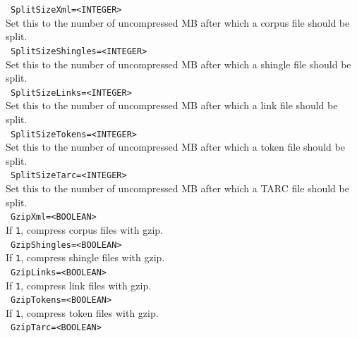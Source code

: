 \documentclass[12pt,a4paper]{article}
\begin{document}
\noindent\textbullet~\texttt{SplitSizeXml=<INTEGER>}\\

Set this to the number of uncompressed MB after which a corpus file should be split.\\

\noindent\textbullet~\texttt{SplitSizeShingles=<INTEGER>}\\

Set this to the number of uncompressed MB after which a shingle file should be split.\\

\noindent\textbullet~\texttt{SplitSizeLinks=<INTEGER>}\\

Set this to the number of uncompressed MB after which a link file should be split.\\

\noindent\textbullet~\texttt{SplitSizeTokens=<INTEGER>}\\

Set this to the number of uncompressed MB after which a token file should be split.\\

\noindent\textbullet~\texttt{SplitSizeTarc=<INTEGER>}\\

Set this to the number of uncompressed MB after which a TARC file should be split.\\

\noindent\textbullet~\texttt{GzipXml=<BOOLEAN>}\\

If \texttt{1}, compress corpus files with gzip.\\

\noindent\textbullet~\texttt{GzipShingles=<BOOLEAN>}\\

If \texttt{1}, compress shingle files with gzip.\\

\noindent\textbullet~\texttt{GzipLinks=<BOOLEAN>}\\

If \texttt{1}, compress link files with gzip.\\

\noindent\textbullet~\texttt{GzipTokens=<BOOLEAN>}\\

If \texttt{1}, compress token files with gzip.\\

\noindent\textbullet~\texttt{GzipTarc=<BOOLEAN>}\\
\end{document}
